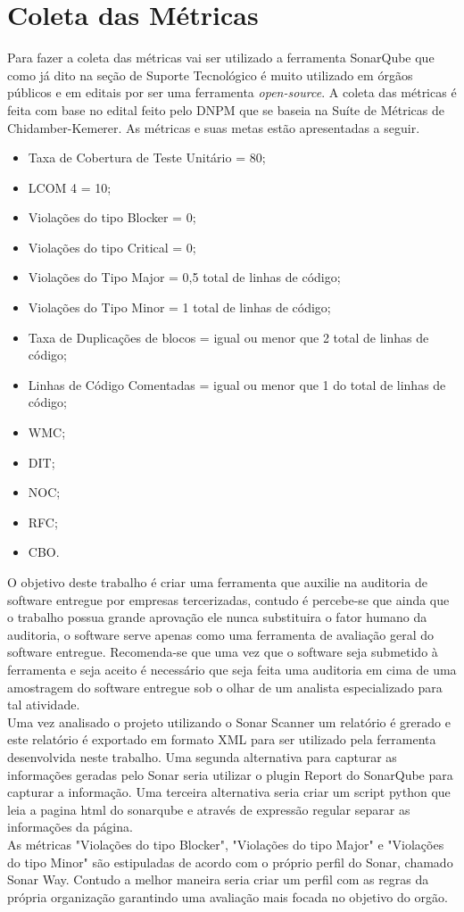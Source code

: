 \section{Coleta das Métricas}
Para fazer a coleta das métricas vai ser utilizado a ferramenta SonarQube que como já dito na seção de Suporte Tecnológico é muito utilizado em órgãos públicos e em editais por ser uma ferramenta \textit{open-source}. A coleta das métricas é feita com base no edital feito pelo DNPM \cite{edital} que se baseia na Suíte de Métricas de Chidamber-Kemerer. As métricas e suas metas estão apresentadas a seguir.
\begin{itemize}
\item Taxa de Cobertura de Teste Unitário = 80;
\item LCOM 4 = 10;
\item Violações do tipo Blocker = 0;
\item Violações do tipo Critical = 0;
\item Violações do Tipo Major = 0,5 total de linhas de código;
\item Violações do Tipo Minor = 1 total de linhas de código;
\item Taxa de Duplicações de blocos = igual ou menor que 2 total de linhas de código;
\item Linhas de Código Comentadas = igual ou menor que 1 do total de linhas de código;
\item WMC;
\item DIT;
\item NOC;
\item RFC;
\item CBO.
\end{itemize}
O objetivo deste trabalho é criar uma ferramenta que auxilie na auditoria de software entregue por empresas tercerizadas, contudo é percebe-se que ainda que o trabalho possua grande aprovação ele nunca substituira o fator humano da auditoria, o software serve apenas como uma ferramenta de avaliação geral do software entregue. Recomenda-se que uma vez que o software seja submetido à ferramenta e seja aceito é necessário que seja feita uma auditoria em cima de uma amostragem do software entregue sob o olhar de um analista especializado para tal atividade.
\\Uma vez analisado o projeto utilizando o Sonar Scanner um relatório é grerado e este relatório é exportado em formato XML para ser utilizado pela ferramenta desenvolvida neste trabalho. Uma segunda alternativa para capturar as informações geradas pelo Sonar seria utilizar o plugin Report do SonarQube para capturar a informação. Uma terceira alternativa seria criar um script python que leia a pagina html do sonarqube e através de expressão regular separar as informações da página.
\\As métricas "Violações do tipo Blocker", "Violações do tipo Major" e "Violações do tipo Minor" são estipuladas de acordo com o próprio perfil do Sonar, chamado Sonar Way. Contudo a melhor maneira seria criar um perfil com as regras da própria organização garantindo uma avaliação mais focada no objetivo do orgão.
